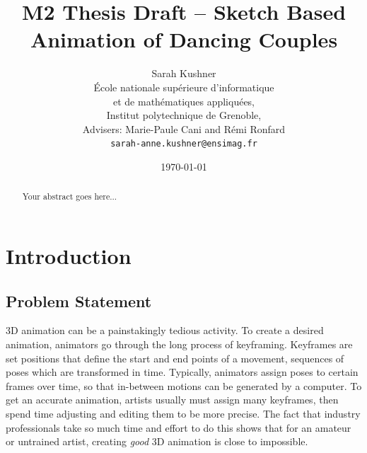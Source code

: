 \documentclass[12pt, a4paper]{memoir}
\begin{document}
\frontmatter

\title{M2 Thesis Draft -- Sketch Based Animation of Dancing Couples}

\author{
Sarah Kushner \\
\'Ecole nationale sup\'erieure d'informatique \\
et de math\'ematiques appliqu\'ees, \\
Institut polytechnique de Grenoble, \\
Advisers: Marie-Paule Cani and R\'emi Ronfard\\

\texttt{sarah-anne.kushner@ensimag.fr}
}

\date{\today}

\begin{titlingpage}
\maketitle
\end{titlingpage}


\renewcommand{\abstracttextfont}{\normalfont}
\abstractintoc
\begin{abstract} 
Your abstract goes here... 
\end{abstract}
\abstractintoc

\mainmatter
\section{Introduction}
\subsection{Problem Statement}
3D animation can be a painstakingly tedious activity. To create a desired animation, animators go through the long process of keyframing. Keyframes are set positions that define the start and end points of a movement, sequences of poses which are transformed in time. Typically, animators assign poses to certain frames over time, so that in-between motions can be generated by a computer. To get an accurate animation, artists usually must assign many keyframes, then spend time adjusting and editing them to be more precise. The fact that industry professionals take so much time and effort to do this shows that for an amateur or untrained artist, creating \textit{good} 3D animation is close to impossible.
\end{document}
